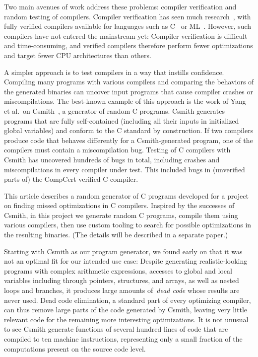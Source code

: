 \documentclass{llncs}
\begin{document}
Two main avenues of work address these problems: compiler verification and
random testing of compilers. Compiler verification has seen much
research~\cite{dave-2003}, with fully verified compilers available for
languages such as C~\cite{leroy-2009} or ML~\cite{tan-2016}. However, such
compilers have not entered the mainstream yet: Compiler verification is
difficult and time-consuming, and verified compilers therefore perform fewer
optimizations and target fewer CPU architectures than others.

A simpler approach is to test compilers in a way that instills confidence.
Compiling many programs with various compilers and comparing the behaviors
of the generated binaries can uncover input programs that cause compiler
crashes or miscompilations. The best-known example of this approach is the
work of Yang et al.\ on Csmith~\cite{csmith-2011}, a generator of random C
programs. Csmith generates programs that are fully self-contained (including
all their inputs in initialized global variables) and conform to the C
standard by construction. If two compilers produce code that behaves
differently for a Csmith-generated program, one of the compilers must
contain a miscompilation bug. Testing of C compilers with Csmith has
uncovered hundreds of bugs in total, including crashes and miscompilations
in every compiler under test. This included bugs in (unverified parts of)
the CompCert verified C compiler.

This article describes a random generator of C programs developed for a
project on finding missed optimizations in C compilers. Inspired by the
successes of Csmith, in this project we generate random C programs, compile
them using various compilers, then use custom tooling to search for possible
optimizations in the resulting binaries. (The details will be described in a
separate paper.) 

Starting with Csmith as our program generator, we found early on that it was
not an optimal fit for our intended use case: Despite generating
realistic-looking programs with complex arithmetic expressions, accesses to
global and local variables including through pointers, structures, and
arrays, as well as nested loops and branches, it produces large amounts
of~\emph{dead code} whose results are never used. Dead code elimination, a
standard part of every optimizing compiler, can thus remove large parts of
the code generated by Csmith, leaving very little relevant code for the
remaining more interesting optimizations. It is not unusual to see Csmith
generate functions of several hundred lines of code that are compiled to ten
machine instructions, representing only a small fraction of the computations
present on the source code level.
\end{document}
